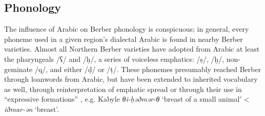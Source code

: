 \documentclass[output=paper]{langsci/langscibook}
\begin{document}
 
 \subsection{Phonology}


The influence of Arabic on Berber phonology is conspicuous; in general, every phoneme used in a given region's dialectal Arabic is found in nearby Berber varieties. Almost all Northern Berber varieties have adopted from Arabic at least the pharyngeals /ʕ/ and /ḥ/, a series of voiceless emphatics: /ṣ/, /ḫ/, non-geminate /q/, and either /ḍ/ or /ṭ/. These phonemes presumably reached Berber through loanwords from Arabic, but have been extended to inherited vocabulary as well, through reinterpretation of emphatic spread or through their use in “expressive formations” \citep[199]{Kossmann2013book}, e.g. Kabyle \textit{θi-ḥəðmər-θ} `breast of a small animal' < \textit{iðmar-ən} `breast'.
\end{document}

